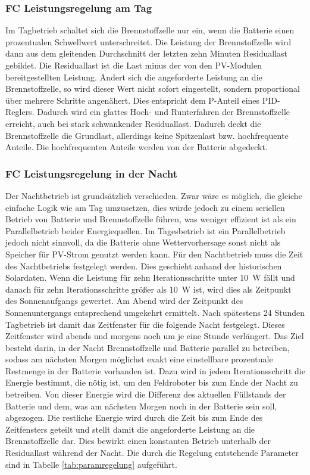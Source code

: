 \subsubsection{FC Leistungsregelung am Tag}
Im Tagbetrieb schaltet sich die Brennstoffzelle nur ein, wenn die Batterie einen prozentualen Schwellwert unterschreitet. Die Leistung der Brennstoffzelle wird dann aus dem gleitenden Durchschnitt der letzten zehn Minuten Residuallast gebildet. Die Residuallast ist die Last minus der von den PV-Modulen bereitgestellten Leistung. Ändert sich die angeforderte Leistung an die Brennstoffzelle, so wird dieser Wert nicht sofort eingestellt, sondern proportional über mehrere Schritte angenähert. Dies entspricht dem P-Anteil eines PID-Reglers. Dadurch wird ein glattes Hoch- und Runterfahren der Brennstoffzelle erreicht, auch bei stark schwankender Residuallast. Dadurch deckt die Brennstoffzelle die Grundlast, allerdings keine Spitzenlast bzw. hochfrequente Anteile. Die hochfrequenten Anteile werden von der Batterie abgedeckt. \\

\subsubsection{FC Leistungsregelung in der Nacht}
Der Nachtbetrieb ist grundsätzlich verschieden. Zwar wäre es möglich, die gleiche einfache Logik wie am Tag umzusetzen, dies würde jedoch zu einem seriellen Betrieb von Batterie und Brennstoffzelle führen, was weniger effizient ist als ein Parallelbetrieb beider Energiequellen. 
Im Tagesbetrieb ist ein Parallelbetrieb jedoch nicht sinnvoll, da die Batterie ohne Wettervorhersage sonst nicht als Speicher für PV-Strom genutzt werden kann. Für den Nachtbetrieb muss die Zeit des Nachtbetriebs festgelegt werden. Dies geschieht anhand der historischen Solardaten. Wenn die Leistung für zehn Iterationsschritte unter 10~W fällt und danach für zehn Iterationsschritte größer als 10~W ist, wird dies als Zeitpunkt des Sonnenaufgangs gewertet. Am Abend wird der Zeitpunkt des Sonnenuntergangs entsprechend umgekehrt ermittelt. Nach spätestens 24 Stunden Tagbetrieb ist damit das Zeitfenster für die folgende Nacht festgelegt. Dieses Zeitfenster wird abends und morgens noch um je eine Stunde verlängert. Das Ziel besteht darin, in der Nacht Brennstoffzelle und Batterie parallel zu betreiben, sodass am nächsten Morgen möglichst exakt eine einstellbare prozentuale Restmenge in der Batterie vorhanden ist. Dazu wird in jedem Iterationsschritt die Energie bestimmt, die nötig ist, um den Feldroboter bis zum Ende der Nacht zu betreiben. Von dieser Energie wird die Differenz des aktuellen Füllstands der Batterie und dem, was am nächsten Morgen noch in der Batterie sein soll, abgezogen. Die restliche Energie wird durch die Zeit bis zum Ende des Zeitfensters geteilt und stellt damit die angeforderte Leistung an die Brennstoffzelle dar. Dies bewirkt einen konstanten Betrieb unterhalb der Residuallast während der Nacht. Die durch die Regelung entstehende Parameter sind in Tabelle \ref{tab:paramregelung} aufgeführt. \\

